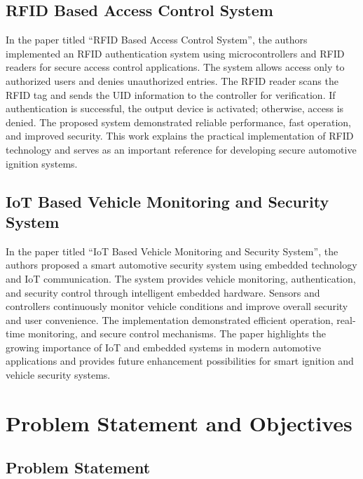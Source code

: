 \documentclass[12pt,a4paper,oneside]{report}
\begin{document}
\section{RFID Based Access Control System}

In the paper titled “RFID Based Access Control System”, the authors implemented an RFID authentication system using microcontrollers and RFID readers for secure access control applications. The system allows access only to authorized users and denies unauthorized entries. The RFID reader scans the RFID tag and sends the UID information to the controller for verification. If authentication is successful, the output device is activated; otherwise, access is denied. The proposed system demonstrated reliable performance, fast operation, and improved security. This work explains the practical implementation of RFID technology and serves as an important reference for developing secure automotive ignition systems.

\section{IoT Based Vehicle Monitoring and Security System}

In the paper titled “IoT Based Vehicle Monitoring and Security System”, the authors proposed a smart automotive security system using embedded technology and IoT communication. The system provides vehicle monitoring, authentication, and security control through intelligent embedded hardware. Sensors and controllers continuously monitor vehicle conditions and improve overall security and user convenience. The implementation demonstrated efficient operation, real-time monitoring, and secure control mechanisms. The paper highlights the growing importance of IoT and embedded systems in modern automotive applications and provides future enhancement possibilities for smart ignition and vehicle security systems.



\chapter{Problem Statement and Objectives}

\section{Problem Statement}
\end{document}
